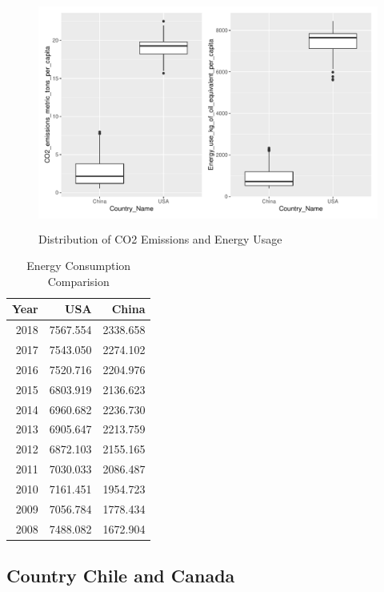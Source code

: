 \documentclass[11pt,a4paper,]{article}
\begin{document}
\begin{figure}[H]
\includegraphics[width=7in, height = 3in]{Figures/distributionco2emissionenergyusageboxplot-1}
\caption{Distribution of CO2 Emissions and Energy Usage}
\label{fig:distributionco2emissionenergyusageboxplot}
\end{figure}

\begin{table}

\caption{\label{tab:EnergyConsumptionComparision}Energy Consumption Comparision}
\centering
\begin{tabular}[t]{r|r|r}
\hline
Year & USA & China\\
\hline
2018 & 7567.554 & 2338.658\\
\hline
2017 & 7543.050 & 2274.102\\
\hline
2016 & 7520.716 & 2204.976\\
\hline
2015 & 6803.919 & 2136.623\\
\hline
2014 & 6960.682 & 2236.730\\
\hline
2013 & 6905.647 & 2213.759\\
\hline
2012 & 6872.103 & 2155.165\\
\hline
2011 & 7030.033 & 2086.487\\
\hline
2010 & 7161.451 & 1954.723\\
\hline
2009 & 7056.784 & 1778.434\\
\hline
2008 & 7488.082 & 1672.904\\
\hline
\end{tabular}
\end{table}

\newpage
\subsection{Country Chile and Canada}
\end{document}

